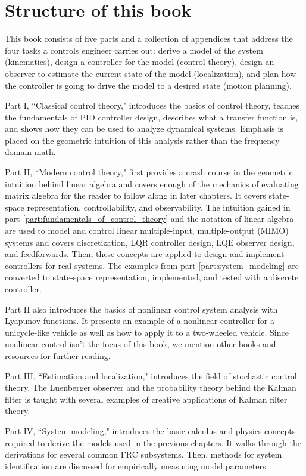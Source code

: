 \section{Structure of this book}

This book consists of five parts and a collection of appendices that address the
four tasks a controls engineer carries out: derive a model of the system
(kinematics), design a controller for the model (control theory), design an
observer to estimate the current state of the model (localization), and plan how
the controller is going to drive the model to a desired state (motion planning).

Part I, ``Classical control theory," introduces the basics of control theory,
teaches the fundamentals of PID controller design, describes what a transfer
function is, and shows how they can be used to analyze dynamical systems.
Emphasis is placed on the geometric intuition of this analysis rather than the
frequency domain math.

Part II, ``Modern control theory," first provides a crash course in the
geometric intuition behind linear algebra and covers enough of the mechanics of
evaluating matrix algebra for the reader to follow along in later chapters. It
covers state-space representation, controllability, and observability. The
intuition gained in part \ref{part:fundamentals_of_control_theory} and the
notation of linear algebra are used to model and control linear multiple-input,
multiple-output (MIMO) systems and covers discretization, LQR controller design,
LQE observer design, and feedforwards. Then, these concepts are applied to
design and implement controllers for real systems. The examples from part
\ref{part:system_modeling} are converted to state-space representation,
implemented, and tested with a discrete controller.

Part II also introduces the basics of nonlinear control system analysis with
Lyapunov functions. It presents an example of a nonlinear controller for a
unicycle-like vehicle as well as how to apply it to a two-wheeled vehicle. Since
nonlinear control isn't the focus of this book, we mention other books and
resources for further reading.

Part III, ``Estimation and localization," introduces the field of stochastic
control theory. The Luenberger observer and the probability theory behind the
Kalman filter is taught with several examples of creative applications of Kalman
filter theory.

Part IV, ``System modeling," introduces the basic calculus and physics concepts
required to derive the models used in the previous chapters. It walks through
the derivations for several common FRC subsystems. Then, methods for system
identification are discussed for empirically measuring model parameters.

